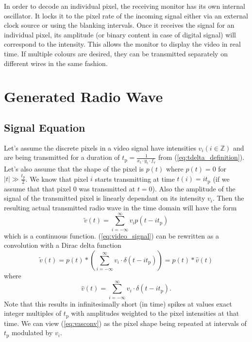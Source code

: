 \documentclass[a4paper,12pt,twoside,openright]{report}
\begin{document}
In order to decode an individual pixel, the receiving monitor has its own internal oscillator. It locks it to the pixel rate of the incoming signal either via an external clock source or using the blanking intervals. Once it receives the signal for an individual pixel, its amplitude (or binary content in case of digital signal) will correspond to the intensity. This allows the monitor to display the video in real time. If multiple colours are desired, they can be transmitted separately on different wires in the same fashion.

\section{Generated Radio Wave}

\subsection{Signal Equation}
Let's assume the discrete pixels in a video signal have intensities $v_{i} (i \in \mathbb{Z})$ and are being transmitted for a duration of $t_\text{p}=\frac{1}{x_\text{t} \cdot y_\text{t} \cdot f_\text{v}}$ from (\ref{eq:tdelta_definition}). Let's also assume that the shape of the pixel is $p(t)$ where $p(t)=0$ for $|t| \gg \frac{t_\text{p}}{2}$. We know that pixel $i$ starts transmitting at time $t(i)=i t_\text{p}$ (if we assume that that pixel 0 was transmitted at $t=0$). Also the amplitude of the signal of the transmitted pixel is linearly dependant on its intensity $v_{i}$. Then the resulting actual transmitted radio wave in the time domain will have the form 
\begin{equation}
\label{eq:video_signal}
\tilde{v}(t) = \sum\limits_{i=-\infty}^{\infty} v_{i} p(t-i t_\text{p})
\end{equation}
which is a continuous function. (\ref{eq:video_signal}) can be rewritten as a convolution with a Dirac delta function
\begin{equation}
\label{eq:vasconv}
\tilde{v}(t) = p(t) \ast \left( \sum\limits_{i=-\infty}^{\infty} v_{i} \cdot \delta(t-i t_\text{p}) \right) = p(t) \ast \hat{v}(t)
\end{equation}
where
\begin{equation}
\label{eq:vhattdef}
\hat{v}(t) = \sum\limits_{i=-\infty}^{\infty} v_{i} \cdot \delta(t-i t_\text{p}) \text{.}
\end{equation}
Note that this results in infinitesimally short (in time) spikes at values exact integer multiples of $t_\text{p}$ with amplitudes weighted to the pixel intensities at that time. We can view (\ref{eq:vasconv}) as the pixel shape being repeated at intervals of $t_\text{p}$ modulated by $v_{i}$. 
\end{document}
